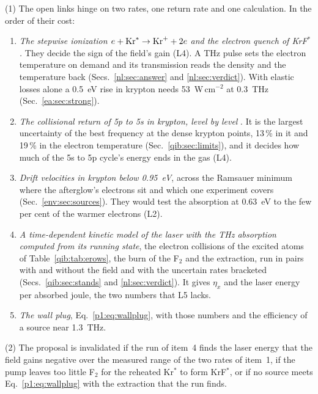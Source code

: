 {\noindent}(1) The open links hinge on two rates, one return rate and one calculation.
In the order of their cost:
\begin{enumerate}
\item \emph{The stepwise ionization $e+{\rm Kr}^*\to{\rm Kr}^++2e$ and the electron
  quench of KrF$^*$.} They decide the sign of the field's gain (L4). A THz pulse sets the
  electron temperature on demand and its transmission reads the density and the
  temperature back (Secs.~\ref{nl:sec:answer} and \ref{nl:sec:verdict}). With elastic
  losses alone a 0.5~eV rise in krypton needs 53~W\,cm$^{-2}$ at 0.3~THz
  (Sec.~\ref{ea:sec:strong}).
\item \emph{The collisional return of 5p to 5s in krypton, level by level}
  \cite{p1:Whitehead1995}. It is the largest uncertainty of the best frequency at the
  dense krypton points, 13\,\% in it and 19\,\% in the electron temperature
  (Sec.~\ref{qib:sec:limits}), and it decides how much of the 5s to 5p cycle's energy
  ends in the gas (L4).
\item \emph{Drift velocities in krypton below 0.95~eV}, across the Ramsauer minimum where
  the afterglow's electrons sit and which one experiment covers
  (Sec.~\ref{env:sec:sources}). They would test the absorption at 0.63~eV to the few per
  cent of the warmer electrons (L2).
\item \emph{A time-dependent kinetic model of the laser with the THz absorption computed
  from its running state}, the electron collisions of the excited atoms of
  Table~\ref{qib:tab:erows}, the burn of the F$_2$ and the extraction, run in pairs with
  and without the field and with the uncertain rates bracketed
  (Secs.~\ref{qib:sec:stands} and \ref{nl:sec:verdict}). It gives $\eta_x$ and the laser
  energy per absorbed joule, the two numbers that L5 lacks.
\item \emph{The wall plug}, Eq.~\eqref{p1:eq:wallplug}, with those numbers and the
  efficiency of a source near 1.3~THz.
\end{enumerate}

{\noindent}(2) The proposal is invalidated if the run of item~4 finds the laser energy
that the field gains negative over the measured range of the two rates of item~1, if
the pump leaves too little F$_2$ for the reheated Kr$^*$ to form KrF$^*$, or if no source
meets Eq.~\eqref{p1:eq:wallplug} with the extraction that the run finds.

